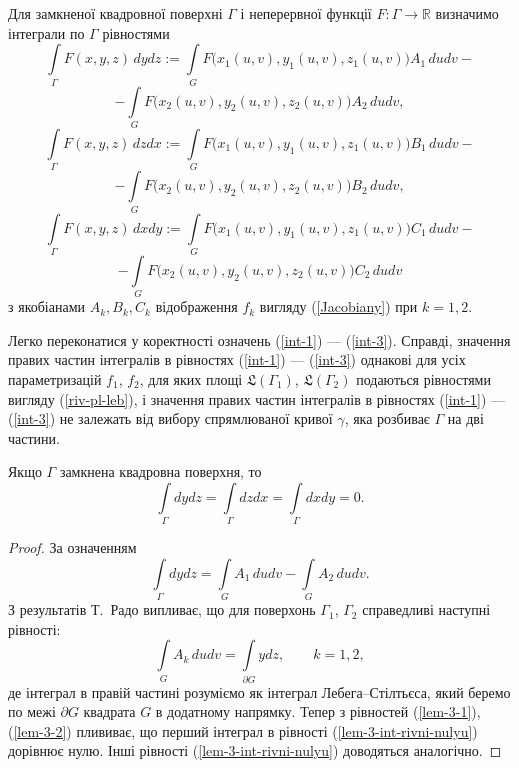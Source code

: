 \documentclass[11pt, reqno]{amsart}
\begin{document}
Для замкненої квадровної поверхні $\Gamma$ і неперервної функції
$F:\Gamma\rightarrow\mathbb{R}$ визначимо інтеграли по $\Gamma$
рівностями
$$\int\limits_{\Gamma}F(x,y,z)\,dydz:=\int\limits_{G}F\Big(x_1(u,v),y_1(u,v),z_1(u,v)\Big)A_1
\,dudv-$$
\begin{equation}\label{int-1}
-\int\limits_{G}F\Big(x_2(u,v),y_2(u,v),z_2(u,v)\Big)A_2\,dudv,
\end{equation}
$$\int\limits_{\Gamma}F(x,y,z)\,dzdx:=\int\limits_{G}F\Big(x_1(u,v),y_1(u,v),z_1(u,v)\Big)B_1
\,dudv-$$
\begin{equation}\label{int-2}
-\int\limits_{G}F\Big(x_2(u,v),y_2(u,v),z_2(u,v)\Big)B_2\,dudv,
\end{equation}
$$\int\limits_{\Gamma}F(x,y,z)\,dxdy:=\int\limits_{G}F\Big(x_1(u,v),y_1(u,v),z_1(u,v)\Big)C_1
\,dudv-$$
\begin{equation}\label{int-3}
-\int\limits_{G}F\Big(x_2(u,v),y_2(u,v),z_2(u,v)\Big)C_2\,dudv
\end{equation}
з якобіанами $A_k,B_k,C_k$ відображення $f_k$ вигляду
(\ref{Jacobiany}) при $k=1,2$.

Легко переконатися у коректності означень (\ref{int-1})
--- (\ref{int-3}). Справді, значення правих частин інтегралів в рівностях
 (\ref{int-1}) --- (\ref{int-3}) однакові для усіх параметризацій $f_1$, $f_2$, для яких площі
$\mathfrak{L}(\Gamma_1)$, $\mathfrak{L}(\Gamma_2)$ подаються
рівностями вигляду (\ref{riv-pl-leb}), і значення правих частин
інтегралів в рівностях (\ref{int-1}) --- (\ref{int-3}) не залежать
від вибору спрямлюваної кривої $\gamma$, яка розбиває $\Gamma$ на
дві частини.\vskip 2mm


\begin{lemma}\label{lema-1} 
Якщо $\Gamma$ замкнена квадровна поверхня, то
\begin{equation}\label{lem-3-int-rivni-nulyu}
\int\limits_{\Gamma}dydz=\int\limits_{\Gamma}dzdx=\int\limits_{\Gamma}dxdy=0.
\end{equation}
\end{lemma}


\begin{proof}
 За означенням
\begin{equation}\label{lem-3-1}
\int\limits_{\Gamma}dydz=\int\limits_{G}A_1\,dudv-\int\limits_{G}A_2\,dudv.
\end{equation}
З результатів Т.~Радо \cite[V.2.64~$(iii)$, IV.4.21~$(iii_3)$]{Rado}
випливає, що для поверхонь $\Gamma_1$, $\Gamma_2$ справедливі
наступні рівності:
\begin{equation}\label{lem-3-2}
\int\limits_{G}A_k\,dudv=\int\limits_{\partial G}ydz,\qquad k=1,2,
\end{equation}
де інтеграл в правій частині розуміємо як інтеграл Лебега--Стілтьєса,
який беремо по межі $\partial G$ квадрата $G$ в додатному напрямку.
Тепер з рівностей (\ref{lem-3-1}), (\ref{lem-3-2}) плививає, що перший
інтеграл в рівності (\ref{lem-3-int-rivni-nulyu}) дорівнює нулю. Інші
рівності (\ref{lem-3-int-rivni-nulyu}) доводяться аналогічно.
\end{proof}
\end{document}
